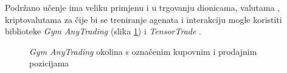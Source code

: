 Podržano učenje ima veliku primjenu i u trgovanju dionicama, valutama , kriptovalutama za čije bi se treniranje agenata i interakciju mogle koristiti biblioteke \textit{Gym AnyTrading} (slika \ref{fig:gym-anytrading}) \cite{GymAnytrading} i \textit{TensorTrade} \cite{Tensortrade}.

\begin{figure}[H]
    \centering
    \caption{\textit{Gym AnyTrading} okolina s označenim kupovnim i prodajnim pozicijama}
    \label{fig:gym-anytrading}
\end{figure}
